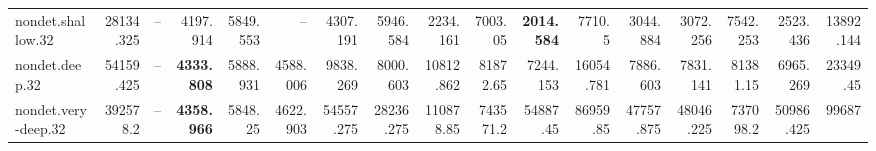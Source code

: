 \documentclass{article}
\begin{document}
\begin{center}
{\begin{tabular}{lrrrrrrrrrrrrrrrr}
nondet.shallow.32 & 28134.325 & -- & 4197.914 & 5849.553 & -- & 4307.191 & 5946.584 & 2234.161 & 7003.05 & \textbf{2014.584} & 7710.5 & 3044.884 & 3072.256 & 7542.253 & 2523.436 & 13892.144 \\
nondet.deep.32 & 54159.425 & -- & \textbf{4333.808} & 5888.931 & 4588.006 & 9838.269 & 8000.603 & 10812.862 & 81872.65 & 7244.153 & 16054.781 & 7886.603 & 7831.141 & 81381.15 & 6965.269 & 23349.45 \\
nondet.very-deep.32 & 392578.2 & -- & \textbf{4358.966} & 5848.25 & 4622.903 & 54557.275 & 28236.275 & 110878.85 & 743571.2 & 54887.45 & 86959.85 & 47757.875 & 48046.225 & 737098.2 & 50986.425 & 99687 \\
\bottomrule
\end{tabular}
}
\end{center}
\end{document}
